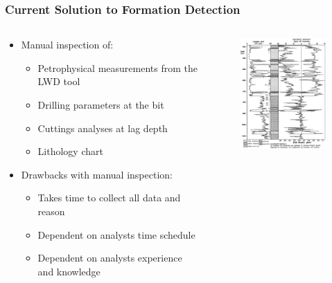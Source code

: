 \documentclass{beamer}
\begin{document}
\begin{frame} \frametitle{Current Solution to Formation Detection} 
\vspace{-1cm}
\begin{columns}[onlytextwidth]
\begin{column}{0.6\textwidth}

\begin{itemize}
\item<1-> Manual inspection of: 
\begin{itemize}
\item<1-> Petrophysical measurements from the LWD tool
\item<1-> Drilling parameters at the bit
\item<1-> Cuttings analyses at lag depth
\item<1-> Lithology chart
\end{itemize}

\item<2-> Drawbacks with manual inspection: 
\begin{itemize}
\item<2-> Takes time to collect all data and reason
\item<2-> Dependent on analysts time schedule
\item<2-> Dependent on analysts experience and knowledge
\end{itemize}
 \end{itemize}
  \end{column}

\begin{column}{0.4\textwidth}
\begin{figure}
\begin{center}
\includegraphics [keepaspectratio,width = 4.7cm] {lithologyGamma.png}
\end{center}
\end{figure}
\end{column}
\end{columns}
\end{frame}
\end{document}
